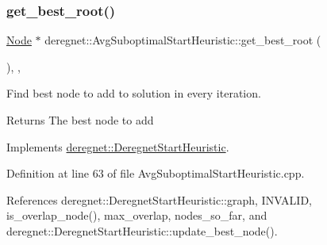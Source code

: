 \mbox{\label{classderegnet_1_1AvgSuboptimalStartHeuristic_a732194c0c56e6f28839114e3ab119109}} 
\subsubsection{\texorpdfstring{get\+\_\+best\+\_\+root()}{get\_best\_root()}}
{\footnotesize\ttfamily \hyperlink{namespacederegnet_a744bad34f2de9856d36715a445f027f3}{Node} $\ast$ deregnet\+::\+Avg\+Suboptimal\+Start\+Heuristic\+::get\+\_\+best\+\_\+root (\begin{DoxyParamCaption}{ }\end{DoxyParamCaption})\hspace{0.3cm}{\ttfamily [override]}, {\ttfamily [private]}, {\ttfamily [virtual]}}



Find best node to add to solution in every iteration. 

\begin{DoxyReturn}{Returns}
The best node to add 
\end{DoxyReturn}


Implements \hyperlink{classderegnet_1_1DeregnetStartHeuristic_a372be86d0fb8ac94bd926a1f4d09e102}{deregnet\+::\+Deregnet\+Start\+Heuristic}.



Definition at line 63 of file Avg\+Suboptimal\+Start\+Heuristic.\+cpp.



References deregnet\+::\+Deregnet\+Start\+Heuristic\+::graph, I\+N\+V\+A\+L\+ID, is\+\_\+overlap\+\_\+node(), max\+\_\+overlap, nodes\+\_\+so\+\_\+far, and deregnet\+::\+Deregnet\+Start\+Heuristic\+::update\+\_\+best\+\_\+node().


